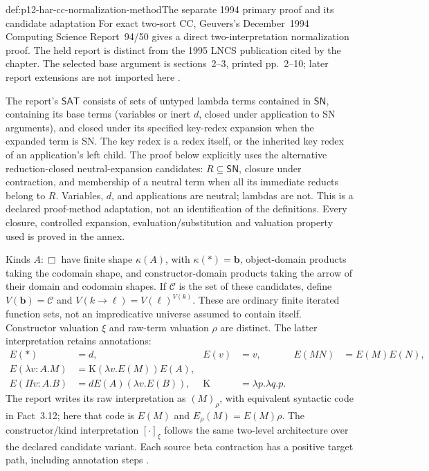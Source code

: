 \begin{hbdefinition}{def:p12-har-cc-normalization-method}{The separate 1994 primary proof and its candidate adaptation}
For exact two-sort CC, Geuvers's December~1994 Computing Science
Report~94/50 gives a direct two-interpretation normalization proof.
The held report is distinct from the 1995 LNCS publication cited by
the chapter. The selected base argument is sections~2--3, printed
pp.~2--10; later report extensions are not imported here
\cite[pp.~2--10]{Geuvers1994Report9450}.

The report's \(\mathsf{SAT}\) consists of sets of untyped lambda
terms contained in \(\mathsf{SN}\), containing its base terms
(variables or inert \(d\), closed under application to SN arguments),
and closed under its specified key-redex expansion when the expanded
term is SN. The key redex is a redex itself, or the inherited key redex
of an application's left child. The proof below explicitly uses the
alternative reduction-closed neutral-expansion candidates:
\(R\subseteq\mathsf{SN}\), closure under contraction, and
membership of a neutral term when all its immediate reducts belong
to \(R\). Variables, \(d\), and applications are neutral;
lambdas are not. This is a declared proof-method adaptation, not an
identification of the definitions. Every closure, controlled expansion,
evaluation/substitution and valuation property used is proved in the annex.

Kinds \(A:\Box\) have finite shape \(\kappa(A)\), with
\(\kappa(\ast)=\mathbf b\), object-domain products taking the
codomain shape, and constructor-domain products taking the arrow of
their domain and codomain shapes. If \(\mathcal C\) is the set of
these candidates, define
\(V(\mathbf b)=\mathcal C\) and
\(V(k\to\ell)=V(\ell)^{V(k)}\). These are ordinary finite
iterated function sets, not an impredicative universe assumed to contain
itself. Constructor valuation \(\xi\) and raw-term valuation
\(\rho\) are distinct. The latter interpretation retains annotations:
\[
\begin{aligned}
 E(\ast)&=d,&E(v)&=v,&E(MN)&=E(M)E(N),\\
 E(\lambda v:A.M)&=\mathrm K(\lambda v.E(M))E(A),\\
 E(\Pi v:A.B)&=dE(A)(\lambda v.E(B)),&
 \mathrm K&=\lambda p.\lambda q.p.
\end{aligned}
\]
The report writes its raw interpretation as \((M)_\rho\),
with equivalent syntactic code in Fact~3.12; here that code is
\(E(M)\) and \(E_\rho(M)=E(M)\rho\). The constructor/kind
interpretation \([\cdot]_\xi\) follows the same two-level
architecture over the declared candidate variant. Each source beta
contraction has a positive target path, including annotation steps
\cite[Definitions~3.1--3.12; Theorems~3.14--3.15]{Geuvers1994Report9450}.
\end{hbdefinition}

